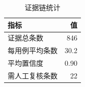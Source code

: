 \begin{table}[H]
\centering
\caption{证据链统计}
\label{tab:evidence_stats}
\small
\begin{tabular}{lr}
\toprule
\textbf{指标} & \textbf{值} \\
\midrule
    证据总条数 & 846 \\
    每用例平均条数 & 30.2 \\
    平均置信度 & 0.90 \\
    需人工复核条数 & 22 \\
\bottomrule
\end{tabular}
\end{table}